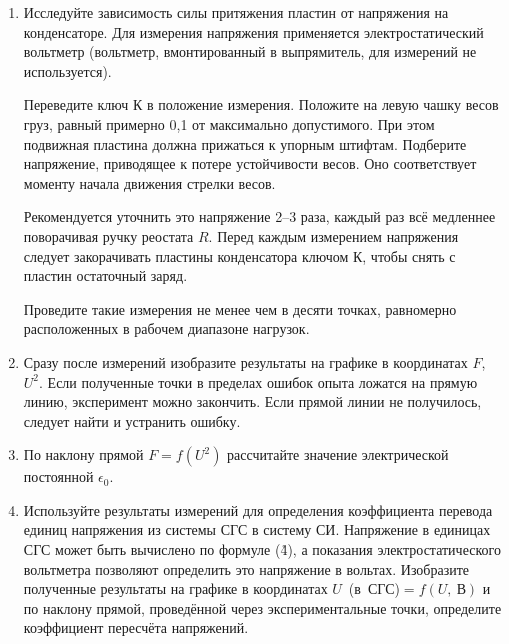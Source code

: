 \begin{lab:task}
\begin{enumerate}
		\item Исследуйте зависимость силы притяжения пластин от напряжения на конденсаторе. Для измерения напряжения применяется
		электростатический вольтметр (вольтметр, вмонтированный в выпрямитель, для измерений не используется).
		
		Переведите ключ К в положение измерения. Положите на левую чашку весов груз, равный примерно 0,1 от максимально
		допустимого. При этом подвижная пластина должна прижаться к упорным штифтам. Подберите напряжение, приводящее к потере
		устойчивости весов. Оно соответствует моменту начала движения стрелки весов.
		
		Рекомендуется уточнить это напряжение 2--3 раза, каждый раз всё медленнее поворачивая ручку реостата $R$. Перед каждым
		измерением напряжения следует закорачивать пластины конденсатора ключом К, чтобы снять с пластин остаточный заряд.
		
		Проведите такие измерения не менее чем в десяти точках, равномерно расположенных в рабочем диапазоне нагрузок.
		
		\item Сразу после измерений изобразите результаты на графике в координатах $F$, $U^2$. Если полученные точки в пределах
		ошибок опыта ложатся на прямую линию, эксперимент можно закончить. Если прямой линии не получилось, следует найти и
		устранить ошибку.
		
		\item По наклону прямой $F=f(U^2)$  рассчитайте значение электрической постоянной $\epsilon_0$.
		
		\item Используйте результаты измерений для определения коэффициента перевода единиц напряжения из системы СГС в систему СИ.
		Напряжение в единицах СГС может быть вычислено по формуле (\r{4}), а показания электростатического вольтметра позволяют
		определить это напряжение в вольтах. Изобразите полученные результаты на графике в координатах $U$~(в~СГС)$=f(U,~В)$ и по
		наклону прямой, проведённой через экспериментальные точки, определите коэффициент пересчёта напряжений.

	\end{enumerate}

\end{lab:task}

